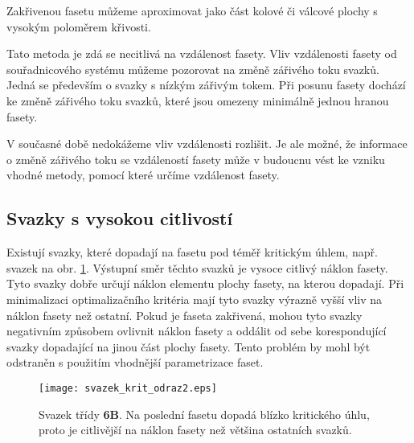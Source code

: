 Zakřivenou fasetu můžeme aproximovat jako část kolové či válcové plochy s vysokým poloměrem křivosti. 
  
Tato metoda je zdá se necitlivá na vzdálenost fasety. Vliv vzdálenosti fasety od souřadnicového systému můžeme pozorovat na změně zářivého toku svazků. Jedná se především o svazky s nízkým zářivým tokem. Při posunu fasety dochází ke změně zářivého toku svazků, které jsou omezeny minimálně jednou hranou fasety. 

V současné době nedokážeme vliv vzdálenosti rozlišit. Je ale možné, že informace o změně zářivého toku se vzdáleností fasety může v budoucnu vést ke vzniku vhodné metody, pomocí které určíme vzdálenost fasety. 


\subsection{Svazky s vysokou citlivostí}

Existují svazky, které dopadají na fasetu pod téměř kritickým úhlem, např. svazek na obr. \ref{fig: kritOdrazSvazek}. Výstupní směr těchto svazků je vysoce citlivý náklon fasety. Tyto svazky dobře určují náklon elementu plochy fasety, na kterou dopadají. Při minimalizaci optimalizačního kritéria mají tyto svazky výrazně vyšší vliv na náklon fasety než ostatní. Pokud je faseta zakřivená, mohou tyto svazky negativním způsobem ovlivnit náklon fasety a oddálit od sebe korespondující svazky dopadající na jinou část plochy fasety. Tento problém by mohl být odstraněn s použitím vhodnější parametrizace faset.   

\begin{figure}[htbp]
    \centering\texttt{[image: svazek\_krit\_odraz2.eps]}
     \caption[Svazek blízko kritického úhlu.]{Svazek třídy \textbf{6B}. Na poslední fasetu dopadá blízko kritického úhlu, proto je citlivější na náklon fasety než většina ostatních svazků.}
 \label{fig: kritOdrazSvazek}
 \end{figure}
 
 
 \clearpage